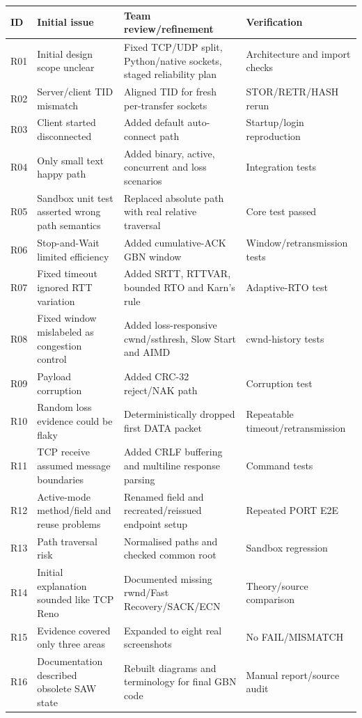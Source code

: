 \begin{longtable}{p{}p{}p{}p{}}
\toprule
ID & Initial issue & Team review/refinement & Verification\\
\midrule
R01 & Initial design scope unclear & Fixed TCP/UDP split, Python/native sockets, staged reliability plan & Architecture and import checks\\
R02 & Server/client TID mismatch & Aligned TID for fresh per-transfer sockets & STOR/RETR/HASH rerun\\
R03 & Client started disconnected & Added default auto-connect path & Startup/login reproduction\\
R04 & Only small text happy path & Added binary, active, concurrent and loss scenarios & Integration tests\\
R05 & Sandbox unit test asserted wrong path semantics & Replaced absolute path with real relative traversal & Core test passed\\
R06 & Stop-and-Wait limited efficiency & Added cumulative-ACK GBN window & Window/retransmission tests\\
R07 & Fixed timeout ignored RTT variation & Added SRTT, RTTVAR, bounded RTO and Karn's rule & Adaptive-RTO test\\
R08 & Fixed window mislabeled as congestion control & Added loss-responsive cwnd/ssthresh, Slow Start and AIMD & cwnd-history tests\\
R09 & Payload corruption & Added CRC-32 reject/NAK path & Corruption test\\
R10 & Random loss evidence could be flaky & Deterministically dropped first DATA packet & Repeatable timeout/retransmission\\
R11 & TCP receive assumed message boundaries & Added CRLF buffering and multiline response parsing & Command tests\\
R12 & Active-mode method/field and reuse problems & Renamed field and recreated/reissued endpoint setup & Repeated PORT E2E\\
R13 & Path traversal risk & Normalised paths and checked common root & Sandbox regression\\
R14 & Initial explanation sounded like TCP Reno & Documented missing rwnd/Fast Recovery/SACK/ECN & Theory/source comparison\\
R15 & Evidence covered only three areas & Expanded to eight real screenshots & No FAIL/MISMATCH\\
R16 & Documentation described obsolete SAW state & Rebuilt diagrams and terminology for final GBN code & Manual report/source audit\\
\bottomrule
\end{longtable}


